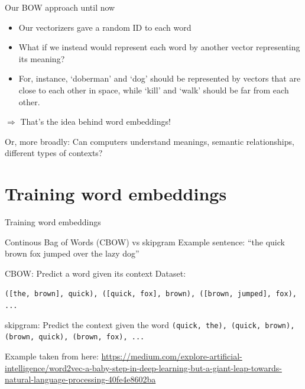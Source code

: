 \documentclass{beamer}
\begin{document}
\begin{frame}{Our BOW approach until now}
\begin{itemize}
	\item Our vectorizers gave a random ID to each word
	\item What if we instead would represent each word by another vector representing its meaning?
	\item For, instance, `doberman' and `dog' should be represented by vectors that are close to each other in space, while `kill' and `walk' should be far from each other.
\end{itemize}
\pause
$\Rightarrow$ That's the idea behind word embeddings!

\pause

Or, more broadly: Can computers understand meanings, semantic relationships, different types of contexts?
\end{frame}


\section{Training word embeddings}
\begin{frame}[plain]
Training word embeddings
\end{frame}

\begin{frame}{Continous Bag of Words (CBOW) vs skipgram}
Example sentence: ``the quick brown fox jumped over the lazy dog''
\begin{block}{CBOW: Predict a word given its context}
Dataset:

\texttt{([the, brown], quick), ([quick, fox], brown), ([brown, jumped], fox), ...}
\end{block}

\pause


\begin{block}{skipgram: Predict the context given the word}	
\texttt{(quick, the), (quick, brown), (brown, quick), (brown, fox), ...}
\end{block}

\tiny{Example taken from here: \url{https://medium.com/explore-artificial-intelligence/word2vec-a-baby-step-in-deep-learning-but-a-giant-leap-towards-natural-language-processing-40fe4e8602ba}}
\end{frame}

\end{document}
